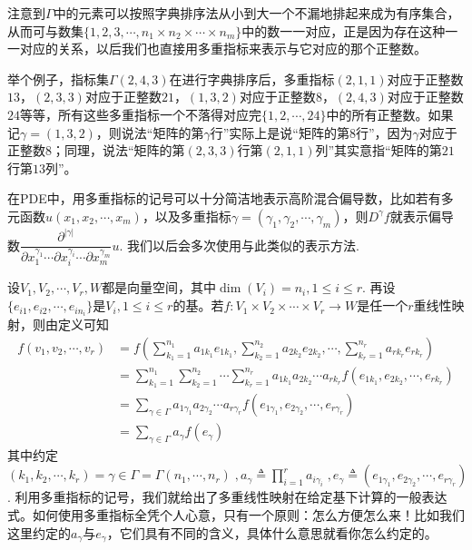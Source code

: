 注意到$\Gamma$中的元素可以按照字典排序法从小到大一个不漏地排起来成为有序集合，从而可与数集$\{1,2,3,\cdots, n_{1}\times n_{2}\times\cdots\times n_{m}\}$中的数一一对应，正是因为存在这种一一对应的关系，以后我们也直接用多重指标来表示与它对应的那个正整数。
 
 举个例子，指标集$\Gamma(2,4,3)$在进行字典排序后，多重指标$(2,1,1)$对应于正整数$13$，$(2,3,3)$对应于正整数$21$，$(1,3,2)$对应于正整数$8$，$(2,4,3)$对应于正整数$24$等等，所有这些多重指标一个不落得对应完$\{1,2,\cdots,24 \}$中的所有正整数。如果记$\gamma=(1,3,2)$，则说法“矩阵的第$\gamma$行”实际上是说“矩阵的第$8$行”，因为$\gamma$对应于正整数$8$；同理，说法“矩阵的第$(2,3,3)$行第$(2,1,1)$列”其实意指“矩阵的第$21$行第$13$列”。
 
 在PDE中，用多重指标的记号可以十分简洁地表示高阶混合偏导数，比如若有多元函数$u(x_{1},x_{2},\cdots,x_{m})$，以及多重指标$\gamma=(\gamma_{1},\gamma_{2},\cdots,\gamma_{m})$，则$D^{\gamma}f$就表示偏导数$\dfrac{\partial^{|\gamma|}}{\partial x_{1}^{\gamma_{1}}\cdots\partial x_{i}^{\gamma_{ i }}\cdots\partial x_{m}^{\gamma_{m}}}u$. 我们以后会多次使用与此类似的表示方法.
 
设$V_{1},V_{2},\cdots,V_{r},W$都是向量空间，其中$\operatorname{dim}(V_{i})=n_{i},1\leqslant i\leqslant r$. 再设$\{e_{i1},e_{i2},\cdots,e_{in_{i}} \}$是$V_{i},1\leqslant i\leqslant r$的基。若$f:V_{1}\times V_{2}\times\cdots\times V_{r}\longrightarrow W$是任一个$r$重线性映射，则由定义可知
\begin{equation}
	\begin{split}
	f(v_{1},v_{2},\cdots,v_{r})&=f\left(\sum_{k_{1}=1}^{n_{1}}a_{1k_{1}}e_{1k_{1}},\sum_{k_{2}=1}^{n_{2}}a_{2k_{2}}e_{2k_{2}},\cdots,\sum_{k_{r}=1}^{n_{r}}a_{rk_{r}}e_{rk_{r}} \right)\\
	&=\sum_{k_{1}=1}^{n_{1}}\sum_{k_{2}=1}^{n_{2}}\cdots\sum_{k_{r}=1}^{n_{r}}a_{1k_{1}}a_{2k_{2}}\cdots a_{rk_{r}}f\left(e_{1k_{1}},e_{2k_{2}},\cdots,e_{rk_{r}} \right)\\
	&=\sum_{ \gamma\in \Gamma }a_{1\gamma_{1}}a_{2\gamma_{2}}\cdots a_{r\gamma_{r}}f\left(e_{1\gamma_{1}},e_{2\gamma_{2}},\cdots,e_{r\gamma_{r}} \right)\\
	&=\sum_{ \gamma\in \Gamma }a_{\gamma}f(e_{\gamma})
	\end{split}
\end{equation}
其中约定$(k_{1},k_{2},\cdots,k_{r})=\gamma\in \Gamma=\Gamma(n_{1},\cdots,n_{r})\;, a_{\gamma}\triangleq \prod_{i=1}^{r}a_{i\gamma_{i}}\;,e_{\gamma}\triangleq \left(e_{1\gamma_{1}},e_{2\gamma_{2}},\cdots,e_{r\gamma_{r}} \right)$. 利用多重指标的记号，我们就给出了多重线性映射在给定基下计算的一般表达式。如何使用多重指标全凭个人心意，只有一个原则：怎么方便怎么来！比如我们这里约定的$a_{\gamma}$与$e_{\gamma}$，它们具有不同的含义，具体什么意思就看你怎么约定的。


